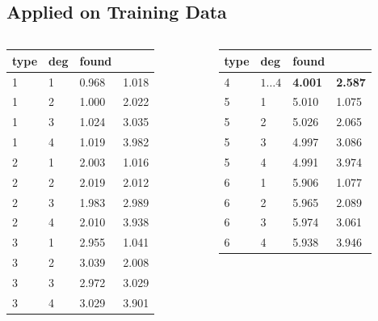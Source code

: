 \documentclass{beamer}
\begin{document}
\subsection{Applied on Training Data}
\begin{frame}
\begin{columns}
  \begin{table}
    \begin{tabular}{|ll|ll|}\hline
      type&deg&found&\\
      \hline\hline
      1 & 1 & 0.968 & 1.018 \\
      1 & 2 & 1.000 & 2.022 \\
      1 & 3 & 1.024 & 3.035 \\
      1 & 4 & 1.019 & 3.982 \\
      \hline
      2 & 1 & 2.003 & 1.016 \\
      2 & 2 & 2.019 & 2.012 \\
      2 & 3 & 1.983 & 2.989 \\
      2 & 4 & 2.010 & 3.938 \\
      \hline
      3 & 1 & 2.955 & 1.041 \\
      3 & 2 & 3.039 & 2.008 \\
      3 & 3 & 2.972 & 3.029 \\
      3 & 4 & 3.029 & 3.901 \\
      \hline
    \end{tabular}
  \end{table}
  \begin{table}
    \begin{tabular}{|ll|ll|}\hline
      type&deg&found&\\
      \hline\hline
      4 & $1\ldots4$ & {\bf 4.001} & {\bf 2.587} \\
      \hline
      5 & 1 & 5.010 & 1.075 \\
      5 & 2 & 5.026 & 2.065 \\
      5 & 3 & 4.997 & 3.086 \\
      5 & 4 & 4.991 & 3.974 \\
      \hline
      6 & 1 & 5.906 & 1.077 \\
      6 & 2 & 5.965 & 2.089 \\
      6 & 3 & 5.974 & 3.061 \\
      6 & 4 & 5.938 & 3.946 \\
      \hline
    \end{tabular}
  \end{table}
\end{columns}
\end{frame}
\end{document}
